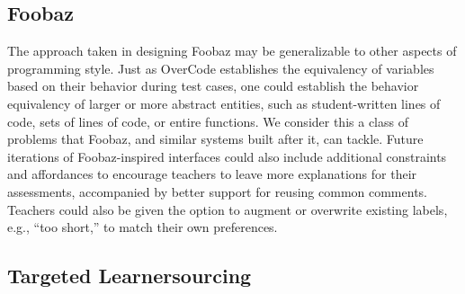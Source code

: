 \documentclass[12pt,twoside]{mitthesis}
\providecommand{\DIFaddbegin}{} %
\providecommand{\DIFaddend}{} %
\providecommand{\DIFdelbegin}{} %
\providecommand{\DIFdelend}{} %
\begin{document}
\subsection{Foobaz}

The approach taken in designing Foobaz may be generalizable to other aspects of programming style. Just as OverCode establishes the equivalency of variables based on their behavior during test cases, one could establish the behavior equivalency of larger or more abstract entities, such as student-written lines of code, sets of lines of code, or entire functions. We consider this a class of problems that Foobaz, and similar systems built after it, can tackle. Future iterations of Foobaz-inspired interfaces could also include additional constraints and affordances to encourage teachers to leave more explanations for their assessments, accompanied by better support for reusing common comments. Teachers could also be given the option to augment or overwrite existing labels, e.g., ``too short,'' to match their own preferences. %

\DIFdelbegin %
\DIFdelend \DIFaddbegin \subsection{Targeted Learnersourcing}
\DIFaddend 
\end{document}
